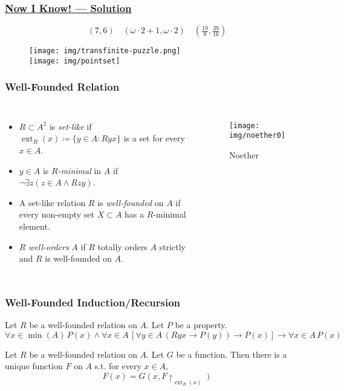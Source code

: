 \documentclass[UTF8,11pt,colorlinks,compress,openany]{beamer}%
\begin{document}
\begin{frame}\frametitle{\href{http://jdh.hamkins.org/transfinite-epistemic-logic-puzzle-challenge/}{Now I Know! --- Solution}}
\vspace{-3ex}
	\[(7,6)\quad(\omega\cdot 2+1,\omega\cdot 2)\quad(\tfrac{19}{8},\tfrac{39}{16})\]\vspace{-3ex}
	\begin{figure}
		\texttt{[image: img/transfinite-puzzle.png]}\\
		\texttt{[image: img/pointset]}
	\end{figure}
\end{frame}

\begin{frame}\frametitle{Well-Founded Relation}
\begin{columns}
\begin{itemize}
\item $R\subset A^2$ is \emph{set-like} if $\operatorname{ext}_R(x)\coloneqq \{y\in A: Ryx\}$ is a set for every $x\in A$.
\item $y\in A$ is \emph{$R$-minimal} in $A$ if $\neg\exists z(z\in A\wedge Rzy)$.
\item A set-like relation $R$ is \emph{well-founded} on $A$ if every non-empty set $X\subset A$ has a $R$-minimal element.
\item $R$ \emph{well-orders} $A$ if $R$ totally orders $A$ strictly and $R$ is well-founded on $A$.
\end{itemize}
	\begin{figure}
		\texttt{[image: img/noether0]}\caption{Noether}
	\end{figure}
\end{columns}
\end{frame}

\begin{frame}\frametitle{Well-Founded Induction/Recursion}
\begin{theorem}
Let $R$ be a well-founded relation on $A$. Let $P$ be a property.
\[\forall x\in \min(A)\,P(x)\wedge \forall x\in A\,[\forall y\in A\,(Ryx\to P(y))\to P(x)]\to \forall x\in A\,P(x)\]
\end{theorem}
\begin{theorem}
Let $R$ be a well-founded relation on $A$. Let $G$ be a function. Then there is a unique function $F$ on $A$ s.t. for every $x\in A$,
\[F(x)=G(x,F{\restriction_{\operatorname{ext}_R(x)}})\]
\end{theorem}
\end{frame}
\end{document}
